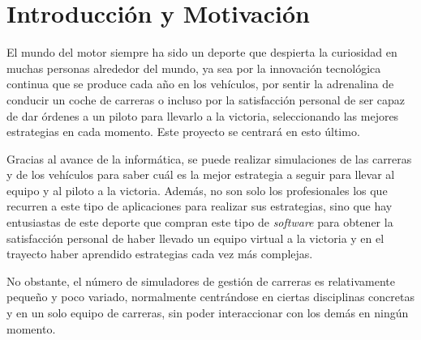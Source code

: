 \documentclass[a4paper,11pt]{book}
\begin{document}



\tableofcontents
\newpage
%

\section{Introducción y Motivación}

El mundo del motor siempre ha sido un deporte que despierta la curiosidad en muchas personas alrededor del mundo, ya sea por la innovación tecnológica continua que se produce cada año en los vehículos, por sentir la adrenalina de conducir un coche de carreras o incluso por la satisfacción personal de ser capaz de dar órdenes a un piloto para llevarlo a la victoria, seleccionando las mejores estrategias en cada momento. Este proyecto se centrará en esto último.

\bigskip

Gracias al avance de la informática, se puede realizar simulaciones de las carreras y de los vehículos para saber cuál es la mejor estrategia a seguir para llevar al equipo y al piloto a la victoria. Además, no son solo los profesionales los que recurren a este tipo de aplicaciones para realizar sus estrategias, sino que hay entusiastas de este deporte que compran este tipo de \textit{software} para obtener la satisfacción personal de haber llevado un equipo virtual a la victoria y en el trayecto haber aprendido estrategias cada vez más complejas.



\bigskip

No obstante, el número de simuladores de gestión de carreras es relativamente pequeño y poco variado, normalmente centrándose en ciertas disciplinas concretas y en un solo equipo de carreras, sin poder interaccionar con los demás en ningún momento. %
\end{document}
